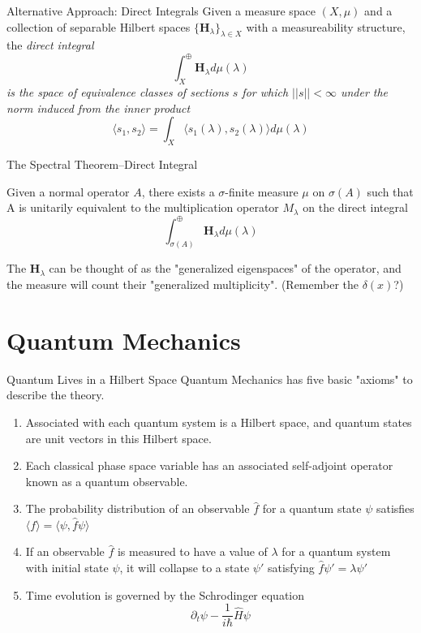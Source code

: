 \documentclass{beamer}
\begin{document}
\begin{frame}{Alternative Approach: Direct Integrals}
    Given a measure space $(X,\mu)$ and a collection of separable Hilbert spaces
    $\{\textbf{H}_{\lambda}\}_{\lambda \in X}$ with a measureability structure,
    the \em direct integral \em 
            \[
                \int_{X}^{\oplus} \textbf{H}_{\lambda} d\mu(\lambda)
            \]
    is the space of equivalence classes of sections $s$ for which
    $||s|| < \infty$ under the norm induced from the inner product
    \[
        \langle s_1, s_2 \rangle = 
        \int_X\langle s_1(\lambda),s_2(\lambda) \rangle d\mu(\lambda)
    \]

\end{frame}

\begin{frame}{The Spectral Theorem--Direct Integral}
    \begin{theorem}
        Given a normal operator $A$, there exists a $\sigma$-finite measure $\mu$
        on $\sigma(A)$ such that A is unitarily equivalent to the multiplication
        operator $M_{\lambda}$ on the direct integral
        \[
            \int_{\sigma(A)}^{\oplus} \textbf{H}_{\lambda} d\mu(\lambda)
        \]
    \end{theorem}

    The $\textbf{H}_{\lambda}$ can be thought of as the "generalized
    eigenspaces" of the operator, and the measure will count their "generalized
    multiplicity". (Remember the $\delta(x)$?)
\end{frame}

\section{Quantum Mechanics}
\begin{frame}{Quantum Lives in a Hilbert Space}
Quantum Mechanics has five basic "axioms" to describe the theory.

    \begin{enumerate}
        \item Associated with each quantum system is a Hilbert space, and
            quantum states are unit vectors in this Hilbert space.
        \item Each classical phase space variable has an associated self-adjoint
            operator known as a quantum observable.
        \item The probability distribution of an observable $\hat{f}$ for a
            quantum state $\psi$ satisfies $\langle f \rangle =
            \langle \psi, \hat{f} \psi \rangle$
        \item If an observable $\hat{f}$ is measured to have a value of
            $\lambda$ for a quantum system with initial state $\psi$, it will
            collapse to a state $\psi '$ satisfying $\hat{f}\psi' = \lambda
            \psi'$
        \item Time evolution is governed by the Schrodinger equation
            \[
                \partial_t \psi - \frac{1}{i\hbar}\hat{H}\psi
            \]
    \end{enumerate}
\end{frame}
\end{document}
